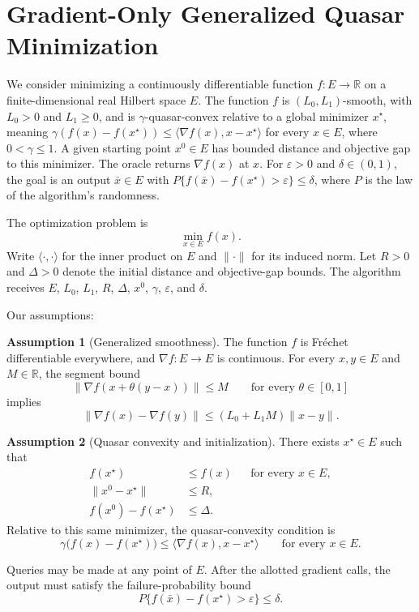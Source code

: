 \documentclass[10pt]{article}
\theoremstyle{definition}
\newtheorem{assumption}{Assumption}
\begin{document}
\section*{Gradient-Only Generalized Quasar Minimization}
We consider minimizing a continuously differentiable function $f:E\to\mathbb{R}$ on a finite-dimensional real Hilbert space $E$. The function $f$ is $(L_0,L_1)$-smooth, with $L_0>0$ and $L_1\geq0$, and is $\gamma$-quasar-convex relative to a global minimizer $x^\star$, meaning $\gamma(f(x)-f(x^\star))\leq\langle\nabla f(x),x-x^\star\rangle$ for every $x\in E$, where $0<\gamma\leq1$. A given starting point $x^0\in E$ has bounded distance and objective gap to this minimizer. The oracle returns $\nabla f(x)$ at $x$. For $\varepsilon>0$ and $\delta\in(0,1)$, the goal is an output $\bar{x}\in E$ with $P\{f(\bar{x})-f(x^\star)>\varepsilon\}\leq\delta$, where $P$ is the law of the algorithm's randomness.

The optimization problem is
\[
\min_{x\in E} f(x).
\]
Write $\langle\cdot,\cdot\rangle$ for the inner product on $E$ and $\|\cdot\|$ for its induced norm. Let $R>0$ and $\Delta>0$ denote the initial distance and objective-gap bounds. The algorithm receives $E$, $L_0$, $L_1$, $R$, $\Delta$, $x^0$, $\gamma$, $\varepsilon$, and $\delta$.

Our assumptions:
\begin{assumption}[Generalized smoothness]
The function $f$ is Fr\'echet differentiable everywhere, and $\nabla f:E\to E$ is continuous. For every $x,y\in E$ and $M\in\mathbb{R}$, the segment bound
\[
\|\nabla f(x+\theta(y-x))\|\leq M
\qquad\text{for every }\theta\in[0,1]
\]
implies
\[
\|\nabla f(x)-\nabla f(y)\|
\leq (L_0+L_1M)\|x-y\|.
\]
\end{assumption}

\begin{assumption}[Quasar convexity and initialization]
There exists $x^\star\in E$ such that
\[
\begin{aligned}
f(x^\star)&\leq f(x) &&\text{for every }x\in E,\\
\|x^0-x^\star\|&\leq R,\\
f(x^0)-f(x^\star)&\leq\Delta.
\end{aligned}
\]
Relative to this same minimizer, the quasar-convexity condition is
\[
\gamma\bigl(f(x)-f(x^\star)\bigr)
\leq\langle\nabla f(x),x-x^\star\rangle
\qquad\text{for every }x\in E.
\]
\end{assumption}

Queries may be made at any point of $E$. After the allotted gradient calls, the output must satisfy the failure-probability bound
\[
P\bigl\{f(\bar{x})-f(x^\star)>\varepsilon\bigr\}
\leq\delta.
\]
\end{document}
